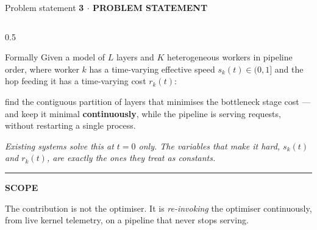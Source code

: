 \documentclass[aspectratio=169,9pt]{beamer}
\newcommand{\kicker}[1]{{\scriptsize\color{keBlue}\bfseries\MakeUppercase{#1}}\par\vspace{0.2em}}
\newcommand{\hl}[1]{\textbf{\color{keNavy}#1}}
\newenvironment{callout}[2][keBlue]{%
  \begin{beamercolorbox}[wd=\textwidth, sep=6pt, leftskip=4pt]{}%
  \setlength{\fboxrule}{0pt}%
  {\color{#1}\rule{2.5pt}{1.1em}}\hspace{0.5em}%
  {\scriptsize\color{#1}\bfseries\MakeUppercase{#2}}\par\vspace{0.25em}%
  \small
}{\end{beamercolorbox}}
\begin{document}
\begin{frame}[shrink=25]{Problem statement}
  \kicker{3 $\cdot$ Problem Statement}
  \begin{columns}[T]
    \begin{column}{0.5\textwidth}

      \begin{block}{Formally}
        \small
        Given a model of \hl{$L$} layers and \hl{$K$} heterogeneous workers in
        pipeline order, where worker $k$ has a time-varying effective speed
        $s_k(t) \in (0,1]$ and the hop feeding it has a time-varying cost
        $r_k(t)$:
        \vspace{0.4em}

        find the contiguous partition of layers that minimises the bottleneck
        stage cost --- and keep it minimal \hl{continuously}, while the
        pipeline is serving requests, without restarting a single process.
        \vspace{0.4em}

        {\color{keMuted}\itshape Existing systems solve this at $t = 0$ only.
        The variables that make it hard, $s_k(t)$ and $r_k(t)$, are exactly the
        ones they treat as constants.}
      \end{block}
      \vspace{0.3em}
      \begin{callout}[keOrange]{scope}
        The contribution is not the optimiser. It is \emph{re-invoking} the
        optimiser continuously, from live kernel telemetry, on a pipeline that
        never stops serving.
      \end{callout}


\end{column}
\end{columns}
\end{frame}
\end{document}
